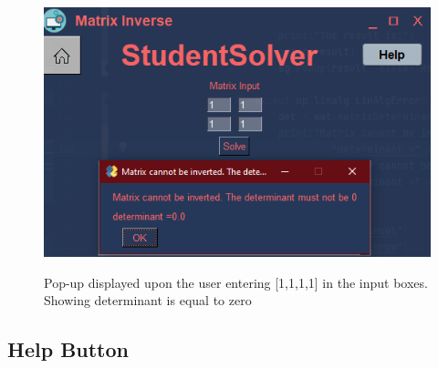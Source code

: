 \documentclass[final]{cmpreport}
\begin{document}
		\begin{figure}[H]
		\caption{Pop-up displayed upon the user entering [1,1,1,1] in the input boxes. Showing determinant is equal to zero}
		\centering
		\includegraphics[scale=1]{invertnot.png}
		\label{fig:invnot}
	\end{figure}
	
	
	\subsection{Help Button} \label{sec:help}
	
\end{document}
